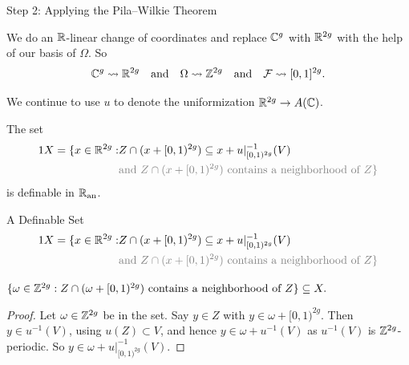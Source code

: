 \documentclass{beamer}
\begin{document}
\begin{frame}{Step 2: Applying the Pila--Wilkie Theorem}


  We do an ${\mathbb{R}}$-linear change of coordinates and
  replace ${\mathbb{C}}^g$ with ${\mathbb{R}}^{2g}$ with the help of our basis of
  $\Omega$. So
  \begin{equation*}
    {\mathbb{C}}^g\leadsto {\mathbb{R}}^{2g}\quad\text{and}\quad
    \Omega \leadsto {\mathbb{Z}}^{2g} \quad\text{and}\quad {\mathcal F} \leadsto
    [0,1]^{2g}.
  \end{equation*}  

  We continue to use $u$ to denote the uniformization ${\mathbb{R}}^{2g}
  \rightarrow A({\mathbb{C}})$.
  
  The set
  \begin{alignat*}1  
    X =  \{x \in\IR^{2g} : & Z\cap (x+[0,1)^{2g}) \subset x+u|_{[0,1)^{2g}}^{-1}(V)\\
    &\color{gray}{\text{and } Z\cap(x+[0,1)^{2g})\text{ contains a
        neighborhood of $Z$}}
    \}
  \end{alignat*}
  is definable in ${{\mathbb{R}}_{\mathrm{an}}}$.
   
\end{frame}

\begin{frame}{A Definable Set} 
  \begin{alignat*}1  
    X =  \{x \in\IR^{2g} : & Z\cap (x+[0,1)^{2g}) \subset x+u|_{[0,1)^{2g}}^{-1}(V)\\
    &\color{gray}{\text{and } Z\cap(x+[0,1)^{2g})\text{ contains a
        neighborhood of $Z$}}
    \}
  \end{alignat*}
  
  \begin{lemma}
    $\{\omega\in{\mathbb{Z}}^{2g} :    Z\cap (\omega+[0,1)^{2g})\text{
      contains a neighborhood  of $Z$}\} \subseteq X.$
  \end{lemma}
  \begin{proof}
    Let $\omega \in{\mathbb{Z}}^{2g}$ be in the set. 
    Say $y\in Z$ with $y\in \omega+[0,1)^{2g}$. Then $y\in
    u^{-1}(V)$, using $u(Z)\subset V$, and hence $y \in \omega+u^{-1}(V)$
    as $u^{-1}(V)$ is ${\mathbb{Z}}^{2g}$-periodic. So $y \in
    \omega+u|_{[0,1)^{2g}}^{-1}(V)$.
  \end{proof}  
\end{frame}
\end{document}

